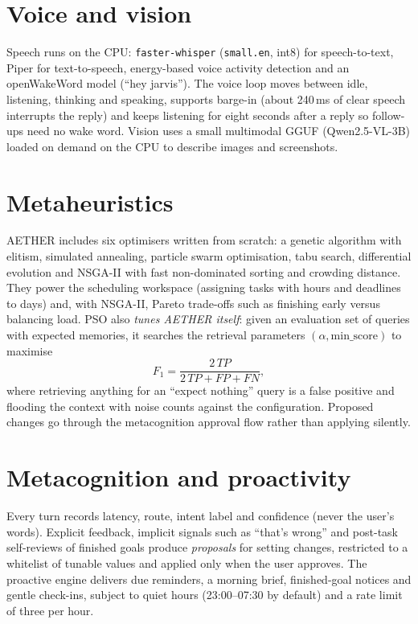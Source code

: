 \documentclass[11pt,a4paper]{article}
\newcommand{\code}[1]{\texttt{#1}}
\begin{document}
\section{Voice and vision}
Speech runs on the CPU: \code{faster-whisper} (\code{small.en}, int8) for speech-to-text, Piper for text-to-speech, energy-based voice activity detection and an openWakeWord model (``hey jarvis''). The voice loop moves between idle, listening, thinking and speaking, supports barge-in (about 240\,ms of clear speech interrupts the reply) and keeps listening for eight seconds after a reply so follow-ups need no wake word. Vision uses a small multimodal GGUF (Qwen2.5-VL-3B) loaded on demand on the CPU to describe images and screenshots.

\section{Metaheuristics}\label{sec:opt}
AETHER includes six optimisers written from scratch: a genetic algorithm with elitism, simulated annealing, particle swarm optimisation, tabu search, differential evolution and NSGA-II with fast non-dominated sorting and crowding distance. They power the scheduling workspace (assigning tasks with hours and deadlines to days) and, with NSGA-II, Pareto trade-offs such as finishing early versus balancing load. PSO also \emph{tunes AETHER itself}: given an evaluation set of queries with expected memories, it searches the retrieval parameters $(\alpha, \text{min\_score})$ to maximise
\[
  F_1 = \frac{2\,TP}{2\,TP + FP + FN},
\]
where retrieving anything for an ``expect nothing'' query is a false positive and flooding the context with noise counts against the configuration. Proposed changes go through the metacognition approval flow rather than applying silently.

\section{Metacognition and proactivity}
Every turn records latency, route, intent label and confidence (never the user's words). Explicit feedback, implicit signals such as ``that's wrong'' and post-task self-reviews of finished goals produce \emph{proposals} for setting changes, restricted to a whitelist of tunable values and applied only when the user approves. The proactive engine delivers due reminders, a morning brief, finished-goal notices and gentle check-ins, subject to quiet hours (23:00--07:30 by default) and a rate limit of three per hour.
\end{document}
